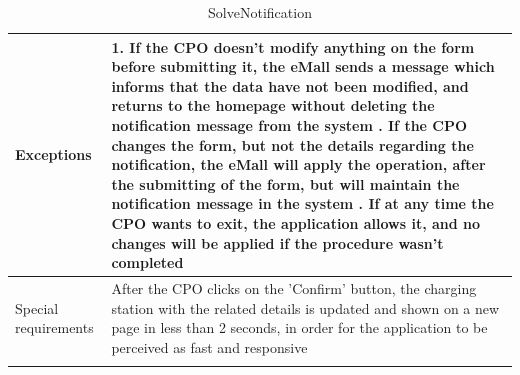 \begin{center}
\begin{longtable}{p{4cm} p{11cm}}
     \hline
     Exceptions &   1. If the CPO doesn't modify anything on the form before submitting it, the eMall sends a                       message which informs that the data have not been modified, and returns to the homepage without                 deleting the notification message from the system \newline
                    2. If the CPO changes the form, but not the details regarding the notification, the eMall will apply the operation, after the submitting of the form, but will maintain the notification message in the system \newline 
                    3. If at any time the CPO wants to exit, the application allows it, and no changes will be applied if the procedure wasn't completed \\
     \hline
     Special requirements & After the CPO clicks on the 'Confirm' button, the charging station with the related details is updated and shown on a new page in less than 2 seconds, in order for the application to be perceived as fast and responsive \\
     \hline
    \caption{SolveNotification}
    \label{tab:SolveNotification}
    \end{longtable}
\end{center}

